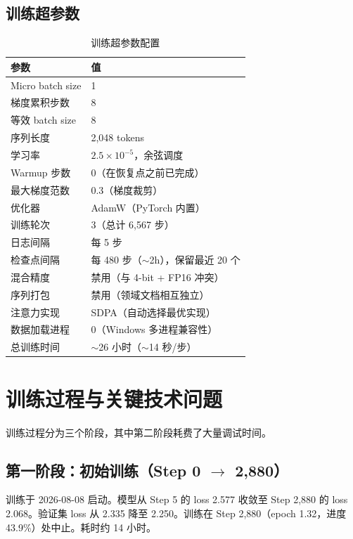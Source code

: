 \documentclass[12pt,a4paper]{ctexart}
\begin{document}
\subsection{训练超参数}

\begin{table}[htbp]\centering
\caption{训练超参数配置}
\begin{tabular}{@{}ll@{}}
\toprule
\textbf{参数} & \textbf{值} \\
\midrule
Micro batch size    & 1 \\
梯度累积步数        & 8 \\
等效 batch size     & 8 \\
序列长度            & 2,048 tokens \\
学习率              & $2.5 \times 10^{-5}$，余弦调度 \\
Warmup 步数         & 0（在恢复点之前已完成）\\
最大梯度范数        & 0.3（梯度裁剪）\\
优化器              & AdamW（PyTorch 内置）\\
训练轮次            & 3（总计 6,567 步）\\
日志间隔            & 每 5 步 \\
检查点间隔          & 每 480 步（$\sim$2h），保留最近 20 个 \\
混合精度            & 禁用（与 4-bit + FP16 冲突）\\
序列打包            & 禁用（领域文档相互独立）\\
注意力实现          & SDPA（自动选择最优实现）\\
数据加载进程        & 0（Windows 多进程兼容性）\\
总训练时间          & $\sim$26 小时（$\sim$14 秒/步）\\
\bottomrule
\end{tabular}
\end{table}

\section{训练过程与关键技术问题}

训练过程分为三个阶段，其中第二阶段耗费了大量调试时间。

\subsection{第一阶段：初始训练（Step 0 $\to$ 2,880）}

训练于 2026-08-08 启动。模型从 Step 5 的 loss 2.577 收敛至 Step 2,880 的 loss 2.068。验证集 loss 从 2.335 降至 2.250。训练在 Step 2,880（epoch 1.32，进度 43.9\%）处中止。耗时约 14 小时。
\end{document}
